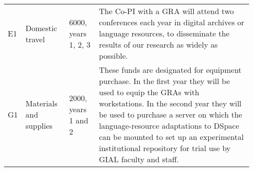\documentclass[11pt]{nsf}
\begin{document}
{\begin{tabular}{lllp{3in}}
E1 & Domestic travel & 6000, years 1, 2, 3 &
The Co-PI with a GRA will attend two conferences each year in digital archives or
language resources, to disseminate the results of our research as
widely as possible.\\

G1 & Materials and supplies & 2000, years 1 and 2 &
These funds are designated for equipment purchase. In the first year they will be used
to equip the GRAs with workstations.  In the second year they will
be used to purchase a server on which the language-resource adaptations to
DSpace can be mounted to set up an experimental institutional repository
for trial use by GIAL faculty and staff.\\

\end{tabular}}
\end{document}

